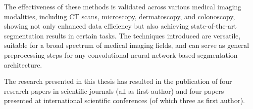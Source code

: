 The effectiveness of these methods is validated across various medical imaging modalities, including CT scans, microscopy, dermatoscopy, and colonoscopy, showing not only enhanced data efficiency but also achieving state-of-the-art segmentation results in certain tasks. The techniques introduced are versatile, suitable for a broad spectrum of medical imaging fields, and can serve as general preprocessing steps for any convolutional neural network-based segmentation architecture.

The research presented in this thesis has resulted in the publication of four research papers in scientific journals (all as first author) and four papers presented at international scientific conferences (of which three as first author). 